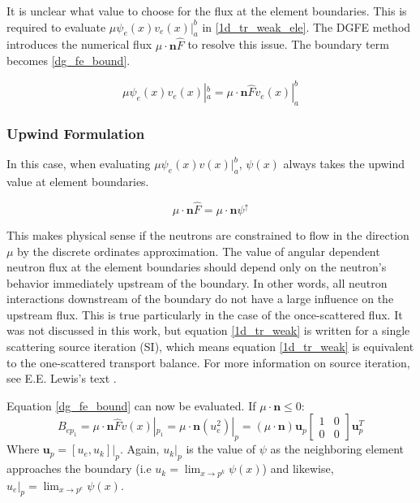 It is unclear what value to choose for the flux at the element boundaries.  This is required to evaluate $\mu \psi_e(x) v_e(x)|_a^b$ in \ref{1d_tr_weak_ele}. The DGFE method introduces the numerical flux $\mu \cdot \mathbf n \hat{F} $ to resolve this issue.  The boundary term becomes \ref{dg_fe_bound}.

\begin{equation}
\mu \psi_e(x) v_e(x)|_a^b = \mu \cdot \mathbf n \hat{F}  v_e(x)|_a^b 
\label{dg_fe_bound}
\end{equation}

\subsubsection{Upwind Formulation}
In this case, when evaluating $\mu \psi_e(x) v(x)|_a^b$, $\psi(x)$ always takes the upwind value at element boundaries.

\begin{equation}
\mu \cdot \mathbf n \hat{F}  = \mu \cdot \mathbf n \psi^{\uparrow} 
\end{equation}

This makes physical sense if the neutrons are constrained to flow in the direction $\mu$ by the discrete ordinates approximation.  The value of angular dependent neutron flux at the element boundaries should depend only on the neutron's behavior immediately upstream of the boundary.  In other words, all neutron interactions downstream of the boundary do not have a large influence on the upstream flux.  This is true particularly in the case of the once-scattered flux.  It was not discussed in this work, but equation \ref{1d_tr_weak} is written for a single scattering source iteration (SI), which means equation \ref{1d_tr_weak} is equivalent to the one-scattered transport balance.  For more information on source iteration, see E.E. Lewis's text \cite{Lewis}.

Equation \ref{dg_fe_bound} can now be evaluated.
If $\mu \cdot \mathbf n \leq 0$: 
\begin{equation}
B_{ep_1} = \mu \cdot \hat{\mathbf n} \hat{F}  v(x)|_{p_1} = 
\mu \cdot \mathbf n (u_e^2)|_p = 
(\mu \cdot \mathbf n) \mathbf u_p 
\begin{bmatrix}
    1      & 0 \\
    0      & 0 
\end{bmatrix}
\mathbf u_p^T
\end{equation}
Where $\mathbf u_p = [u_e, u_k]|_p$.  Again, $u_k|_p$ is the value of $\psi$ as the neighboring element approaches the boundary (i.e $u_k=\lim_{x \to p^k}\psi(x)$)  and likewise, $u_e|_p=\lim_{x \to p^e}\psi(x)$.

